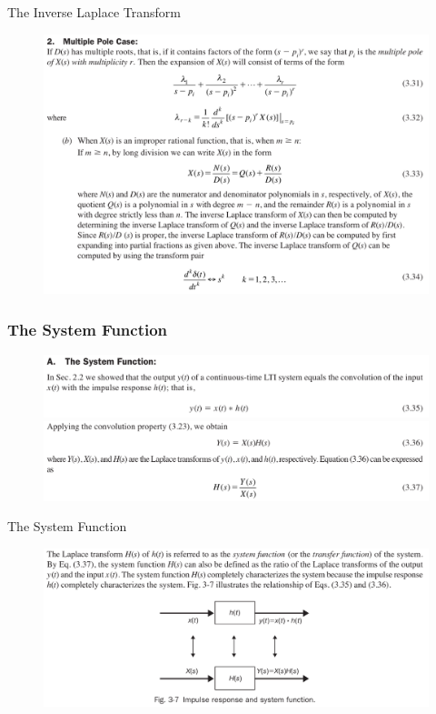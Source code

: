 \documentclass[pdflatex,compress,mathserif]{beamer}
\begin{document}
\begin{frame}{The Inverse Laplace Transform}
	\begin{figure}
		\centering
		\includegraphics[width=\linewidth]{img/img31}
	\end{figure}
\end{frame}

\begin{frame}
	\frametitle{The System Function}
	\begin{figure}
		\centering
		\includegraphics[width=\linewidth]{img/img32}
		\includegraphics[width=\linewidth]{img/img33}
	\end{figure}
\end{frame}

\begin{frame}{The System Function}
	\begin{figure}
		\centering
		\includegraphics[width=\linewidth]{img/img34}
	\end{figure}
\end{frame}
\end{document}
